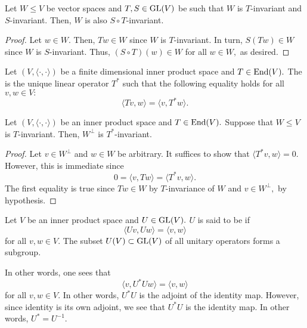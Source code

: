 \begin{prop} \label{prop:STinvariance}
	Let $W \le V$ be vector spaces and $T, S \in \operatorname{GL}(V)$ be such that $W$ is $T$-invariant and $S$-invariant. Then, $W$ is also $S \circ T$-invariant.
\end{prop}
\begin{proof} 
	Let $w \in W.$ Then, $Tw \in W$ since $W$ is $T$-invariant. In turn, $S(Tw) \in W$ since $W$ is $S$-invariant. Thus, $(S \circ T)(w) \in W$ for all $w \in W,$ as desired.
\end{proof}

\begin{defn}%
	Let $(V, \langle \cdot, \cdot\rangle)$ be a finite dimensional inner product space and $T \in \operatorname{End}(V).$ The  is the unique linear operator $T^*$ such that the following equality holds for all $v, w \in V:$
	\begin{equation*} 
		\langle Tv, w\rangle = \langle v, T^*w\rangle.
	\end{equation*}
\end{defn}

\begin{prop} \label{prop:Tadjointinvariance}
	Let $(V, \langle \cdot, \cdot\rangle)$ be an inner product space and $T \in \operatorname{End}(V).$ Suppose that $W \le V$ is $T$-invariant. Then, $W^\perp$ is $T^*$-invariant.
\end{prop}
\begin{proof} 
	Let $v \in W^\perp$ and $w \in W$ be arbitrary. It suffices to show that $\langle T^*v, w\rangle = 0.$ However, this is immediate since
	\begin{equation*} 
		0 = \langle v, Tw\rangle = \langle T^*v, w\rangle.
	\end{equation*}
	The first equality is true since $Tw \in W$ by $T$-invariance of $W$ and $v \in W^\perp,$ by hypothesis.
\end{proof}

\begin{defn}%
	\label{defn:unitaryoperator}
	Let $V$ be an inner product space and $U \in \operatorname{GL}(V).$ $U$ is said to be  if 
	\begin{equation*} 
		\langle Uv, Uw\rangle = \langle v, w\rangle
	\end{equation*}
	for all $v, w \in V.$ The subset $U(V) \subset \operatorname{GL}(V)$ of all unitary operators forms a subgroup.
\end{defn}
In other words, one sees that
\begin{equation*} 
	\langle v, U^*Uw\rangle = \langle v, w\rangle
\end{equation*}
for all $v, w \in V.$ In other words, $U^*U$ is the adjoint of the identity map. However, since identity is its own adjoint, we see that $U^*U$ is the identity map. In other words, $U^* = U^{-1}.$

